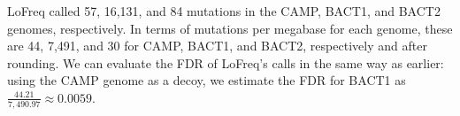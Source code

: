 LoFreq called 57, 16,131, and 84 mutations in the CAMP, BACT1, and BACT2 genomes, respectively. In terms of mutations per megabase for each genome, these are 44, 7,491, and 30 for CAMP, BACT1, and BACT2, respectively and after rounding. We can evaluate the FDR of LoFreq's calls in the same way as earlier: using the CAMP genome as a decoy, we estimate the FDR for BACT1 as $\frac{44.21}{7,490.97} \approx 0.0059$.\endinput